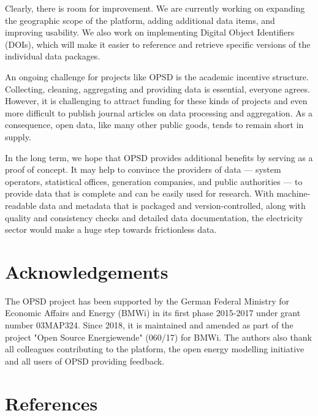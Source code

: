 \documentclass[article,sort&compress]{elsarticle}
\begin{document}
Clearly, there is room for improvement. We are currently working on expanding the geographic scope of the platform, adding additional data items, and improving usability. We also work on implementing Digital Object Identifiers (DOIs), which will make it easier to reference and retrieve specific versions of the individual data packages.

An ongoing challenge for projects like OPSD is the academic incentive structure. Collecting, cleaning, aggregating and providing data is essential, everyone agrees. However, it is challenging to attract funding for these kinds of projects and even more difficult to publish journal articles on data processing and aggregation. As a consequence, open data, like many other public goods, tends to remain short in supply.

In the long term, we hope that OPSD provides additional benefits by serving as a proof of concept. It may help to convince the providers of data --– system operators, statistical offices, generation companies, and public authorities --– to provide data that is complete and can be easily used for research. With machine-readable data and metadata that is packaged and version-controlled, along with quality and consistency checks and detailed data documentation, the electricity sector would make a huge step towards frictionless data.

\section*{Acknowledgements}
The OPSD project has been supported by the German Federal Ministry for Economic Affairs and Energy (BMWi) in its first phase 2015-2017 under grant number 03MAP324. Since 2018, it is maintained and amended as part of the project "Open Source Energiewende" (060/17) for BMWi. The authors also thank all colleagues contributing to the platform, the open energy modelling initiative and all users of OPSD providing feedback. 
\section*{References}


\end{document}
